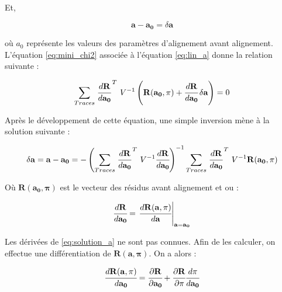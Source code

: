    Et,
   
   \begin{equation}
    \mathbf{a}-\mathbf{a_0} = \delta \mathbf{a}
   \end{equation}
   
   o\`u $a_0$ repr\'esente les valeurs des param\`etres d'alignement avant alignement. L'\'equation \ref{eq:mini_chi2} associ\'ee \`a l'\'equation \ref{eq:lin_a} donne la relation suivante : 
   
   \begin{equation}
    \sum_{Traces} \left. \cfrac{ d \mathbf{R}}{d \mathbf{a_0}}\right.^T \, V^{-1} \left( \mathbf{\mathbf{R}(\mathbf{a_0},\mathbf{\pi})} + \cfrac{ d \mathbf{R}}{d \mathbf{a_0}} \, \delta  \mathbf{a} \right) = 0
    \label{eq:mini_chi2_after_lin}
   \end{equation}
 
   Apr\`es le développement de cette \'equation, une simple inversion m\`ene \`a la solution suivante :
   
   \begin{equation}
    \delta \mathbf{a} = \mathbf{a} -\mathbf{a_0} = - \left( \sum_{Traces} \left. \cfrac{ d \mathbf{R}}{d \mathbf{a_0}} \right.^T \, V^{-1} \cfrac{ d \mathbf{R}}{d \mathbf{a_0}} \right)^{-1} \sum_{Traces} \left. \cfrac{ d \mathbf{R}}{d \mathbf{a_0}} \right.^T \, V^{-1} \mathbf{R}(\mathbf{a_0}, \mathbf{\pi})
    \label{eq:solution_a}
   \end{equation}

   O\`u $\mathbf{R}(\mathbf{a_0}, \mathbf{\pi})$ est le vecteur des r\'esidus avant alignement et ou :
   
   \begin{equation}
     \cfrac{ d \mathbf{R}}{d \mathbf{a_0}} = \left. \cfrac{ d \mathbf{R(\mathbf{a}, \mathbf{\pi})}}{d \mathbf{a}} \right|_{\mathbf{a = a_0}}
     \label{eq:solution_a2}
   \end{equation}

   Les d\'eriv\'ees de \ref{eq:solution_a} ne sont pas connues. Afin de les calculer, on effectue une diff\'erentiation de $\mathbf{R}(\mathbf{a}, \mathbf{\pi})$. On a alors :
   
   \begin{equation}
    \cfrac{d \mathbf{R}(\mathbf{a, \pi} ) }{d \mathbf{a_0} } = \cfrac{ \partial \mathbf{R} }{\partial \mathbf{a_0} } + \cfrac{\partial \mathbf{R}}{\partial \mathbf{\pi} } \cfrac{ d \mathbf{\pi} }{d \mathbf{a_0}}
    \label{eq:diff1}
   \end{equation}

